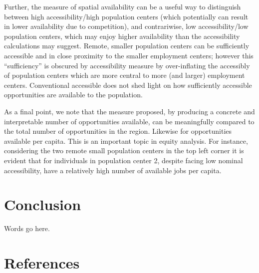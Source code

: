 \documentclass[]{elsarticle} %
\begin{document}
Further, the measure of spatial availability can be a useful way to
distinguish between high accessibility/high population centers (which
potentially can result in lower availability due to competition), and
contrariwise, low accessibility/low population centers, which may enjoy
higher availability than the accessibility calculations may suggest.
Remote, smaller population centers can be sufficiently accessible and in
close proximity to the smaller employment centers; however this
``sufficiency'' is obscured by accessibility measure by over-inflating
the accessibly of population centers which are more central to more (and
larger) employment centers. Conventional accessible does not shed light
on how sufficiently accessible opportunities are available to the
population.

As a final point, we note that the measure proposed, by producing a
concrete and interpretable number of opportunities available, can be
meaningfully compared to the total number of opportunities in the
region. Likewise for opportunities available per capita. This is an
important topic in equity analysis. For instance, considering the two
remote small population centers in the top left corner it is evident
that for individuals in population center 2, despite facing low nominal
accessibility, have a relatively high number of available jobs per
capita.

\hypertarget{conclusion}{%
\section{Conclusion}\label{conclusion}}

Words go here.

\hypertarget{references}{%
\section*{References}\label{references}}
\end{document}

